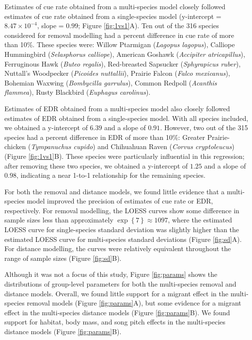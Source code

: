 \documentclass[12pt]{article}
\begin{document}
\par Estimates of cue rate obtained from a multi-species model closely followed estimates of cue rate obtained from a single-species model (y-intercept = $8.47 \times 10^{-4}$, slope = $0.99$; Figure \ref{fig:1vs1}A).
Ten out of the 316 species considered for removal modelling had a percent difference in cue rate of more than 10\%.
These species were: Willow Ptarmigan (\textit{Lagopus lagopus}), Calliope Hummingbird (\textit{Selasphorus calliope}), American Goshawk (\textit{Accipiter atricapillus}), Ferruginous Hawk (\textit{Buteo regalis}), Red-breasted Sapsucker (\textit{Sphyrapicus ruber}), Nuttall's Woodpecker (\textit{Picoides nuttallii}), Prairie Falcon (\textit{Falco mexicanus}), Bohemian Waxwing (\textit{Bombycilla garrulus}), Common Redpoll (\textit{Acanthis flammea}), Rusty Blackbird (\textit{Euphagus carolinus}).

\par Estimates of EDR obtained from a multi-species model also closely followed estimates of EDR obtained from a single-species model. 
With all species included, we obtained a y-intercept of $6.39$ and a slope of $0.91$.
However, two out of the 315 species had a percent difference in EDR of more than 10\%: Greater Prairie-chicken (\textit{Tympanuchus cupido}) and Chihuahuan Raven (\textit{Corvus cryptoleucus}) (Figure \ref{fig:1vs1}B).
These species were particularly influential in this regression; after removing these two species, we obtained a y-intercept of $1.25$ and a slope of $0.98$, indicating a near 1-to-1 relationship for the remaining species.

\par For both the removal and distance models, we found little evidence that a multi-species model improved the precision of estimates of cue rate or EDR, respectively.
For removal modelling, the LOESS curves show some difference in sample sizes less than approximately $\exp\left\{7\right\} \approx 1097$, where the estimated LOESS curve for single-species standard deviation was slightly higher than the estimated LOESS curve for multi-species standard deviations (Figure \ref{fig:sd}A).
For distance modelling, the curves were relatively equivalent throughout the range of sample sizes (Figure \ref{fig:sd}B).

\par Although it was not a focus of this study, Figure \ref{fig:params} shows the distributions of group-level parameters for both the multi-species removal and distance models. 
Overall, we found little support for a migrant effect in the multi-species removal models (Figure \ref{fig:params}A), but some evidence for a migrant effect in the multi-species distance models (Figure \ref{fig:params}B).
We found support for habitat, body mass, and song pitch effects in the multi-species distance models (Figure \ref{fig:params}B).
\end{document}

